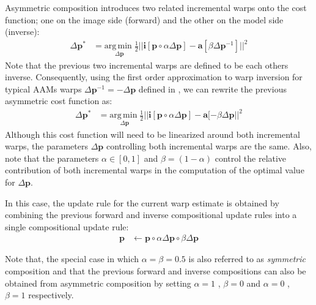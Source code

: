 Asymmetric composition introduces two related incremental warps onto the cost function; one on the image side (forward) and the other on the model side (inverse): 
\begin{equation}
    \begin{aligned}
        \Delta \mathbf{p}^* & = \underset{\Delta \mathbf{p}} {\mathrm{arg\, min\;}} \frac{1}{2}|| \mathbf{i}[\mathbf{p} \circ \alpha \Delta \mathbf{p}] - \mathbf{a} [\beta \Delta \mathbf{p}^{-1}] ||^2
    \label{eq:ssd_ac}
    \end{aligned}
\end{equation}
Note that the previous two incremental warps are defined to be each others inverse. Consequently, using the first order approximation to warp inversion for typical AAMs warps $\Delta\mathbf{p}^{-1} = -\Delta\mathbf{p}$ defined in \cite{Matthews2004}, we can rewrite the previous asymmetric cost function as:
\begin{equation}
    \begin{aligned}
        \Delta \mathbf{p}^* & = \underset{\Delta \mathbf{p}} {\mathrm{arg\, min\;}} \frac{1}{2}|| \mathbf{i}[\mathbf{p} \circ \alpha \Delta \mathbf{p}] - \mathbf{a} [-\beta \Delta \mathbf{p} ||^2
    \label{eq:ssd_ac2}
    \end{aligned}
\end{equation}
Although this cost function will need to be linearized around both incremental warps, the parameters $\Delta \mathbf{p}$ controlling both incremental warps are the same. Also, note that the parameters $\alpha \in [0, 1]$ and $\beta=(1-\alpha)$ control the relative contribution of both incremental warps in the computation of the optimal value for $\Delta \mathbf{p}$. 

In this case, the update rule for the current warp estimate is obtained by combining the previous forward and inverse compositional update rules into a single compositional update rule:
\begin{equation}
 	\begin{aligned}
    	\mathbf{p} & \leftarrow \mathbf{p} \circ \alpha \Delta \mathbf{p} \circ \beta \Delta \mathbf{p}
    \label{eq:ac_update}
    \end{aligned}
\end{equation}

Note that, the special case in which $\alpha = \beta = 0.5$ is also referred to as \emph{symmetric} composition \cite{Megret2008, Autheserre2009, Megret2010} and that the previous forward and inverse compositions can also be obtained from asymmetric composition by setting $\alpha = 1$ , $\beta = 0$ and $\alpha = 0$ , $\beta = 1$ respectively.

